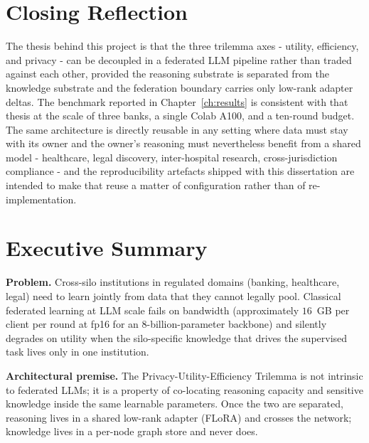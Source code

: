 \documentclass{report}
\begin{document}
\section{Closing Reflection}

The thesis behind this project is that the three trilemma axes - utility, efficiency, and privacy - can be decoupled in a federated LLM pipeline rather than traded against each other, provided the reasoning substrate is separated from the knowledge substrate and the federation boundary carries only low-rank adapter deltas. The benchmark reported in Chapter~\ref{ch:results} is consistent with that thesis at the scale of three banks, a single Colab A100, and a ten-round budget. The same architecture is directly reusable in any setting where data must stay with its owner and the owner's reasoning must nevertheless benefit from a shared model - healthcare, legal discovery, inter-hospital research, cross-jurisdiction compliance - and the reproducibility artefacts shipped with this dissertation are intended to make that reuse a matter of configuration rather than of re-implementation.

\section{Executive Summary}
\label{sec:concl:exec-summary}

\textbf{Problem.} Cross-silo institutions in regulated domains (banking, healthcare, legal) need to learn jointly from data that they cannot legally pool. Classical federated learning at LLM scale fails on bandwidth (approximately $16$~GB per client per round at fp16 for an 8-billion-parameter backbone) and silently degrades on utility when the silo-specific knowledge that drives the supervised task lives only in one institution.

\textbf{Architectural premise.} The Privacy-Utility-Efficiency Trilemma is not intrinsic to federated LLMs; it is a property of co-locating reasoning capacity and sensitive knowledge inside the same learnable parameters. Once the two are separated, reasoning lives in a shared low-rank adapter (FLoRA) and crosses the network; knowledge lives in a per-node graph store and never does.
\end{document}
